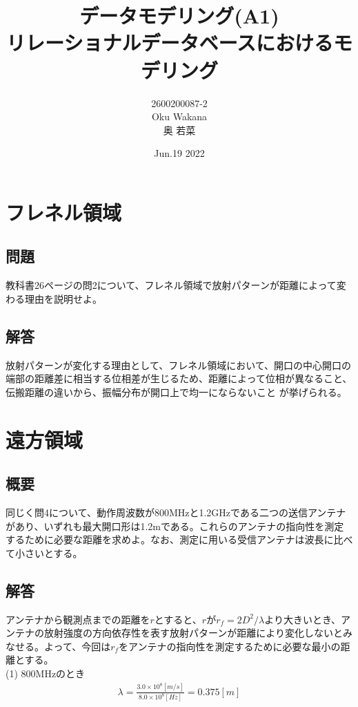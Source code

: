 \documentclass[dvipdfmx,autodetect-engine,titlepage]{jsarticle}
\title{データモデリング(A1)\\
リレーショナルデータベースにおけるモデリング\\
}
\author{2600200087-2\\Oku Wakana\\奥 若菜}
\date{Jun.19 2022}
\begin{document}
\maketitle

\section{フレネル領域}
\subsection{問題}
教科書26ページの問2について、フレネル領域で放射パターンが距離によって変わる理由を説明せよ。
\subsection{解答}
放射パターンが変化する理由として、フレネル領域において、開口の中心開口の端部の距離差に相当する位相差が生じるため、距離によって位相が異なること、伝搬距離の違いから、振幅分布が開口上で均一にならないこと
が挙げられる。\\


\section{遠方領域}
\subsection{概要}
同じく問4について、動作周波数が800MHzと1.2GHzである二つの送信アンテナがあり、いずれも最大開口形は1.2mである。これらのアンテナの指向性を測定するために必要な距離を求めよ。なお、測定に用いる受信アンテナは波長に比べて小さいとする。

\subsection{解答}
アンテナから観測点までの距離を\begin{math}r\end{math}とすると、\begin{math}
  rが r_f=2D^2/ \lambda 
\end{math}より大きいとき、アンテナの放射強度の方向依存性を表す放射パターンが距離により変化しないとみなせる。よって、今回は\begin{math}
  r_f
\end{math}をアンテナの指向性を測定するために必要な最小の距離とする。\\

(1) 800MHzのとき
\begin{eqnarray*}
  \lambda = \frac{3.0 \times  10^8 [m/s]}{8.0 \times  10^8 [Hz]}
  = 0.375 [m]
\end{eqnarray*}
\end{document}
